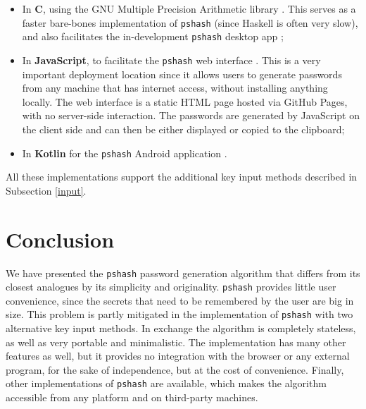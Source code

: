 \documentclass[a4paper, 10pt]{article}
\theoremstyle{plain}
\theoremstyle{definition}
\begin{document}
\begin{itemize}
  \item In \textbf{C}, using the GNU Multiple Precision Arithmetic library \cite{gmp}. This serves as a faster bare-bones implementation of \texttt{pshash} (since Haskell is often very slow), and also facilitates the in-development \texttt{pshash} desktop app \cite{pshash-gui-src};

  \item In \textbf{JavaScript}, to facilitate the \texttt{pshash} web interface \cite{pshash}. This is a very important deployment location since it allows users to generate passwords from any machine that has internet access, without installing anything locally. The web interface is a static HTML page hosted via GitHub Pages, with no server-side interaction. The passwords are generated by JavaScript on the client side and can then be either displayed or copied to the clipboard;

  \item In \textbf{Kotlin} for the \texttt{pshash} Android application \cite{pshash-app-src}.
\end{itemize}

All these implementations support the additional key input methods described in Subsection \ref{input}.

\section{Conclusion}

We have presented the \texttt{pshash} password generation algorithm that differs from its closest analogues by its simplicity and originality. \texttt{pshash} provides little user convenience, since the secrets that need to be remembered by the user are big in size. This problem is partly mitigated in the implementation of \texttt{pshash} with two alternative key input methods. In exchange the algorithm is completely stateless, as well as very portable and minimalistic. The implementation has many other features as well, but it provides no integration with the browser or any external program, for the sake of independence, but at the cost of convenience. Finally, other implementations of \texttt{pshash} are available, which makes the algorithm accessible from any platform and on third-party machines.



\end{document}
